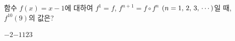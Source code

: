 \hspace*{2mm}\begin{minipage}[t]{\dimexpr\linewidth-2mm\relax}\vspace{0pt}
함수 $f(x)=x-1$에 대하여 $f^1=f$, $f^{n+1}=f\circ f^n$ $(n=1,\mkern3mu 2,\mkern3mu 3,\mkern3mu \cdots)$일 때, $f^{10}(9)$의 값은?
\begin{choices32}{$-2$}{$-1$}{$1$}{$2$}{$3$}\end{choices32}\end{minipage}
